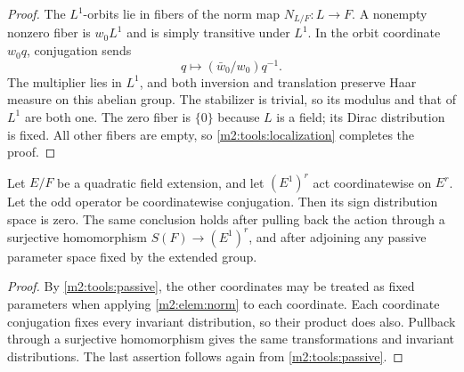 \begin{proof}
The $L^1$-orbits lie in fibers of the norm map $N_{L/F}:L\to F$.
A nonempty nonzero fiber
is $w_0L^1$ and is simply transitive under $L^1$. In the orbit
coordinate $w_0q$, conjugation sends
\[
 q\longmapsto(\bar w_0/w_0)q^{-1}.
\]
The multiplier lies in $L^1$, and both inversion and translation
preserve Haar measure on this abelian group. The stabilizer is
trivial, so its modulus and that of $L^1$ are both one. The zero
fiber is $\{0\}$ because $L$ is a field; its Dirac
distribution is fixed. All other fibers are empty, so
\cref{m2:tools:localization} completes the proof.
\end{proof}

\begin{lemma}\label{m2:elem:products}
Let $E/F$ be a quadratic field extension, and let $(E^1)^r$ act
coordinatewise on $E^r$. Let the odd
operator be coordinatewise conjugation. Then its sign
distribution space is zero. The same conclusion holds after
pulling back the action through a surjective homomorphism
$S(F)\to(E^1)^r$, and after adjoining any passive parameter
space fixed by the extended group.
\end{lemma}

\begin{proof}
By \cref{m2:tools:passive}, the other coordinates may be treated as
fixed parameters when applying \cref{m2:elem:norm} to each coordinate. Each
coordinate conjugation fixes every invariant distribution, so their
product does also. Pullback through a surjective homomorphism gives
the same transformations and invariant distributions. The last
assertion follows again from \cref{m2:tools:passive}.
\end{proof}

